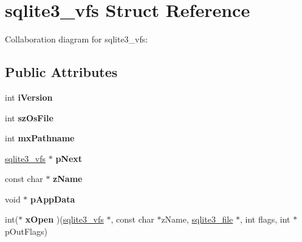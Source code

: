\hypertarget{structsqlite3__vfs}{}\section{sqlite3\+\_\+vfs Struct Reference}
\label{structsqlite3__vfs}


Collaboration diagram for sqlite3\+\_\+vfs\+:
\subsection*{Public Attributes}
\begin{DoxyCompactItemize}
\item 
int {\bfseries i\+Version}\hypertarget{structsqlite3__vfs_a694dd264949bd163545fe174510ed019}{}\label{structsqlite3__vfs_a694dd264949bd163545fe174510ed019}

\item 
int {\bfseries sz\+Os\+File}\hypertarget{structsqlite3__vfs_a549399081342d61134b6398562a0a997}{}\label{structsqlite3__vfs_a549399081342d61134b6398562a0a997}

\item 
int {\bfseries mx\+Pathname}\hypertarget{structsqlite3__vfs_adb2d82c74891b00b5529fb94e7710135}{}\label{structsqlite3__vfs_adb2d82c74891b00b5529fb94e7710135}

\item 
\hyperlink{structsqlite3__vfs}{sqlite3\+\_\+vfs} $\ast$ {\bfseries p\+Next}\hypertarget{structsqlite3__vfs_a4b12c503e4083854a9c4d91697a12de3}{}\label{structsqlite3__vfs_a4b12c503e4083854a9c4d91697a12de3}

\item 
const char $\ast$ {\bfseries z\+Name}\hypertarget{structsqlite3__vfs_a01a82d3e1a7efc00a762a00751ed592b}{}\label{structsqlite3__vfs_a01a82d3e1a7efc00a762a00751ed592b}

\item 
void $\ast$ {\bfseries p\+App\+Data}\hypertarget{structsqlite3__vfs_a8de686c5e679ba421479ac96d6654527}{}\label{structsqlite3__vfs_a8de686c5e679ba421479ac96d6654527}

\item 
int($\ast$ {\bfseries x\+Open} )(\hyperlink{structsqlite3__vfs}{sqlite3\+\_\+vfs} $\ast$, const char $\ast$z\+Name, \hyperlink{structsqlite3__file}{sqlite3\+\_\+file} $\ast$, int flags, int $\ast$p\+Out\+Flags)\hypertarget{structsqlite3__vfs_a5f35d5528d8fdf1d26e1e206879afbe1}{}\label{structsqlite3__vfs_a5f35d5528d8fdf1d26e1e206879afbe1}


\end{DoxyCompactItemize}
